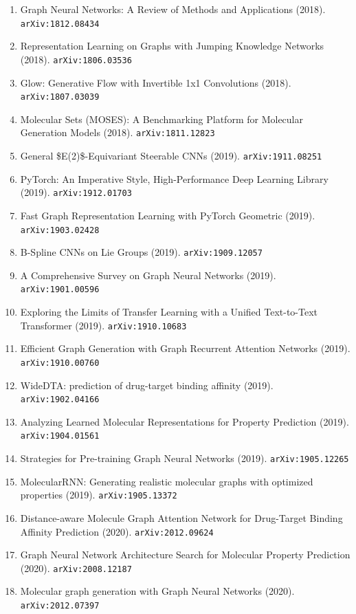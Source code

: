 \documentclass[11pt]{article}
\begin{document}
\begin{enumerate}
  \item Graph Neural Networks: A Review of Methods and Applications (2018). \texttt{arXiv:1812.08434}
  \item Representation Learning on Graphs with Jumping Knowledge Networks (2018). \texttt{arXiv:1806.03536}
  \item Glow: Generative Flow with Invertible 1x1 Convolutions (2018). \texttt{arXiv:1807.03039}
  \item Molecular Sets (MOSES): A Benchmarking Platform for Molecular Generation
  Models (2018). \texttt{arXiv:1811.12823}
  \item General \$E(2)\$-Equivariant Steerable CNNs (2019). \texttt{arXiv:1911.08251}
  \item PyTorch: An Imperative Style, High-Performance Deep Learning Library (2019). \texttt{arXiv:1912.01703}
  \item Fast Graph Representation Learning with PyTorch Geometric (2019). \texttt{arXiv:1903.02428}
  \item B-Spline CNNs on Lie Groups (2019). \texttt{arXiv:1909.12057}
  \item A Comprehensive Survey on Graph Neural Networks (2019). \texttt{arXiv:1901.00596}
  \item Exploring the Limits of Transfer Learning with a Unified Text-to-Text
  Transformer (2019). \texttt{arXiv:1910.10683}
  \item Efficient Graph Generation with Graph Recurrent Attention Networks (2019). \texttt{arXiv:1910.00760}
  \item WideDTA: prediction of drug-target binding affinity (2019). \texttt{arXiv:1902.04166}
  \item Analyzing Learned Molecular Representations for Property Prediction (2019). \texttt{arXiv:1904.01561}
  \item Strategies for Pre-training Graph Neural Networks (2019). \texttt{arXiv:1905.12265}
  \item MolecularRNN: Generating realistic molecular graphs with optimized
  properties (2019). \texttt{arXiv:1905.13372}
  \item Distance-aware Molecule Graph Attention Network for Drug-Target Binding
  Affinity Prediction (2020). \texttt{arXiv:2012.09624}
  \item Graph Neural Network Architecture Search for Molecular Property
  Prediction (2020). \texttt{arXiv:2008.12187}
  \item Molecular graph generation with Graph Neural Networks (2020). \texttt{arXiv:2012.07397}

\end{enumerate}
\end{document}
